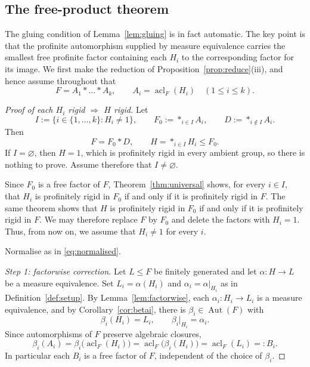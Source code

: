 \documentclass[11pt]{amsart}
\theoremstyle{plain}
\theoremstyle{definition}
\newcommand{\acl}{\operatorname{acl}}
\newcommand{\Aut}{\operatorname{Aut}}
\begin{document}
\subsection{The free-product theorem}\label{sec:general-thm}


The gluing condition of Lemma~\ref{lem:gluing} is in fact automatic.  The key
point is that the profinite automorphism supplied by measure equivalence carries
the smallest free profinite factor containing each $H_i$ to the corresponding
factor for its image.  We first make the reduction of
Proposition~\ref{prop:reduce}(iii), and hence assume throughout that
\begin{equation}\label{eq:normalised}
  F=A_1*\dots*A_k,\qquad A_i=\acl_F(H_i)\quad(1\le i\le k).
\end{equation}

\begin{proof}[Proof of each $H_i$ rigid $\Rightarrow$ $H$ rigid]
Let
\[
  I:=\{i\in\{1,\dots,k\}:H_i\neq1\},
  \qquad
  F_0:=\mathop{\ast}_{i\in I}A_i,
  \qquad
  D:=\mathop{\ast}_{i\notin I}A_i.
\]
Then
\[
  F=F_0*D,
  \qquad
  H=\mathop{\ast}_{i\in I}H_i\le F_0.
\]
If $I=\varnothing$, then $H=1$, which is profinitely rigid in every
ambient group, so there is nothing to prove. Assume therefore that
$I\neq\varnothing$.

Since $F_0$ is a free factor of $F$, Theorem~\ref{thm:universal} shows,
for every $i\in I$, that $H_i$ is profinitely rigid in $F_0$ if and only
if it is profinitely rigid in $F$. The same theorem shows that $H$ is
profinitely rigid in $F_0$ if and only if it is profinitely rigid in
$F$. We may therefore replace $F$ by $F_0$ and delete the factors with
$H_i=1$. Thus, from now on, we assume that $H_i\neq1$ for every $i$.

Normalise as in \eqref{eq:normalised}.

\medskip\noindent\emph{Step 1: factorwise correction.}
Let $L\le F$ be finitely generated and let $\alpha\colon H\to L$ be a measure
equivalence.  Set $L_i=\alpha(H_i)$ and $\alpha_i=\alpha|_{H_i}$ as in
Definition~\ref{def:setup}.  By Lemma~\ref{lem:factorwise}, each
$\alpha_i\colon H_i\to L_i$ is a measure equivalence, and by
Corollary~\ref{cor:betai}, there is $\beta_i\in\Aut(F)$ with
\[
  \beta_i(H_i)=L_i,\qquad \beta_i|_{H_i}=\alpha_i .
\]
Since automorphisms of $F$ preserve algebraic closures,
\begin{equation}\label{eq:star}
  \beta_i(A_i)=\beta_i\bigl(\acl_F(H_i)\bigr)
  =\acl_F\bigl(\beta_i(H_i)\bigr)=\acl_F(L_i)=:B_i .
\end{equation}
In particular each $B_i$ is a free factor of $F$, independent of the choice of
$\beta_i$.


\end{proof}
\end{document}

